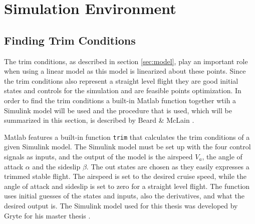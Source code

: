\chapter{Simulation Environment}


\section{Finding Trim Conditions}

The trim conditions, as described in section \ref{sec:model}, play an important role when using a linear model as this model is linearized about these points. Since the trim conditions also represent a straight level flight they are good initial states and controls for the simulation and are feasible points optimization. In order to find the trim conditions a built-in Matlab function together wtih a Simulink model will be used and the procedure that is used, which will be summarized in this section, is described by Beard \& McLain \cite{uavBEARD}.

Matlab features a built-in function \texttt{trim} that calculates the trim conditions of a given Simulink model. The Simulink model must be set up with the four control signals as inputs, and the output of the model is the airspeed $V_a$, the angle of attack $\alpha$ and the sideslip $\beta$. The out states are chosen as they easily expresses a trimmed stable flight. The airspeed is set to the desired cruise speed, while the angle of attack and sideslip is set to zero for a straight level flight. The function uses initial guesses of the states and inputs, also the derivatives, and what the desired output is. The Simulink model used for this thesis was developed by Gryte for his master thesis \cite{GRYTE}.